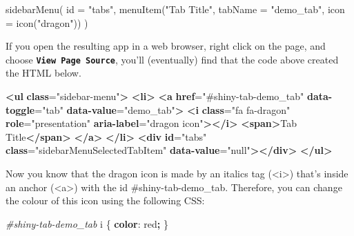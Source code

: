 \documentclass[
  oneside]{book}
\newenvironment{Shaded}{\begin{snugshade}}{\end{snugshade}}
\newcommand{\AttributeTok}[1]{\textcolor[rgb]{0.77,0.63,0.00}{#1}}
\newcommand{\ConstantTok}[1]{\textcolor[rgb]{0.00,0.00,0.00}{#1}}
\newcommand{\ErrorTok}[1]{\textcolor[rgb]{0.64,0.00,0.00}{\textbf{#1}}}
\newcommand{\FunctionTok}[1]{\textcolor[rgb]{0.00,0.00,0.00}{#1}}
\newcommand{\KeywordTok}[1]{\textcolor[rgb]{0.13,0.29,0.53}{\textbf{#1}}}
\newcommand{\NormalTok}[1]{#1}
\newcommand{\OperatorTok}[1]{\textcolor[rgb]{0.81,0.36,0.00}{\textbf{#1}}}
\newcommand{\OtherTok}[1]{\textcolor[rgb]{0.56,0.35,0.01}{#1}}
\newcommand{\PreprocessorTok}[1]{\textcolor[rgb]{0.56,0.35,0.01}{\textit{#1}}}
\newcommand{\StringTok}[1]{\textcolor[rgb]{0.31,0.60,0.02}{#1}}
\begin{document}
\begin{Shaded}
\begin{Highlighting}[]
\FunctionTok{sidebarMenu}\NormalTok{(}
    \AttributeTok{id =} \StringTok{"tabs"}\NormalTok{,}
    \FunctionTok{menuItem}\NormalTok{(}\StringTok{"Tab Title"}\NormalTok{, }\AttributeTok{tabName =} \StringTok{"demo\_tab"}\NormalTok{, }\AttributeTok{icon =} \FunctionTok{icon}\NormalTok{(}\StringTok{"dragon"}\NormalTok{))}
\NormalTok{)}
\end{Highlighting}
\end{Shaded}

If you open the resulting app in a web browser, right click on the page, and choose \textbf{\texttt{View\ Page\ Source}}, you'll (eventually) find that the code above created the HTML below.

\begin{Shaded}
\begin{Highlighting}[]
\KeywordTok{\textless{}ul} \ErrorTok{class}\OtherTok{=}\StringTok{"sidebar{-}menu"}\KeywordTok{\textgreater{}}
  \KeywordTok{\textless{}li\textgreater{}}
    \KeywordTok{\textless{}a} \ErrorTok{href}\OtherTok{=}\StringTok{"\#shiny{-}tab{-}demo\_tab"} \ErrorTok{data{-}toggle}\OtherTok{=}\StringTok{"tab"} \ErrorTok{data{-}value}\OtherTok{=}\StringTok{"demo\_tab"}\KeywordTok{\textgreater{}}
      \KeywordTok{\textless{}i} \ErrorTok{class}\OtherTok{=}\StringTok{"fa fa{-}dragon"} \ErrorTok{role}\OtherTok{=}\StringTok{"presentation"} \ErrorTok{aria{-}label}\OtherTok{=}\StringTok{"dragon icon"}\KeywordTok{\textgreater{}\textless{}/i\textgreater{}}
      \KeywordTok{\textless{}span\textgreater{}}\NormalTok{Tab Title}\KeywordTok{\textless{}/span\textgreater{}}
    \KeywordTok{\textless{}/a\textgreater{}}
  \KeywordTok{\textless{}/li\textgreater{}}
  \KeywordTok{\textless{}div} \ErrorTok{id}\OtherTok{=}\StringTok{"tabs"} \ErrorTok{class}\OtherTok{=}\StringTok{"sidebarMenuSelectedTabItem"} \ErrorTok{data{-}value}\OtherTok{=}\StringTok{"null"}\KeywordTok{\textgreater{}\textless{}/div\textgreater{}}
\KeywordTok{\textless{}/ul\textgreater{}}
\end{Highlighting}
\end{Shaded}

Now you know that the dragon icon is made by an italics tag (\NormalTok{<i>}) that's inside an anchor (\NormalTok{<a>}) with the \NormalTok{id} \NormalTok{\#shiny-tab-demo\_tab}. Therefore, you can change the colour of this icon using the following CSS:

\begin{Shaded}
\begin{Highlighting}[]
\PreprocessorTok{\#shiny{-}tab{-}demo\_tab}\NormalTok{ i \{ }\KeywordTok{color}\NormalTok{: }\ConstantTok{red}\OperatorTok{;}\NormalTok{ \}}
\end{Highlighting}
\end{Shaded}
\end{document}
